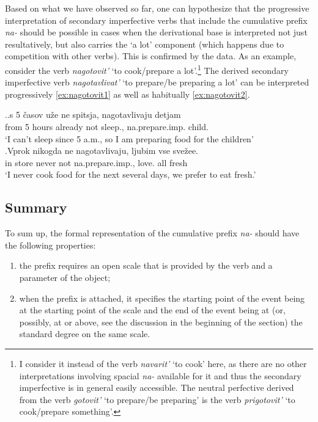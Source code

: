 Based on what we have observed so far, one can hypothesize that the progressive interpretation of secondary imperfective verbs that include the cumulative prefix \textit{na-} should be possible in cases when the derivational base is interpreted not just resultatively, but also carries the `a lot' component (which happens due to competition with other verbs). This is confirmed by the data. As an example, consider the verb \textit{nagotovit'} `to cook/prepare a lot'.\footnote{I consider it instead of the verb \textit{navarit'} `to cook' here, as there are no other interpretations involving spacial \textit{na-} available for it and thus the secondary imperfective is in general easily accessible. The neutral perfective derived from the verb \textit{gotovit'} `to prepare/be preparing' is the verb \textit{prigotovit'} `to cook/prepare something'.}  The derived secondary imperfective verb \textit{nagotavlivat'} `to prepare/be preparing a lot' can be interpreted progressively \ref{ex:nagotovit1} as well as habitually \ref{ex:nagotovit2}.

\ex.\label{ex:nagotovit}\ag.\label{ex:nagotovit1}s 5 \v{c}asov u\v{z}e ne spitsja, nagotavlivaju detjam\\
from 5 hours already not sleep., na.prepare.imp. child.\\
\trans `I can't sleep since 5 a.m., so I am preparing food for the children'\\
\bg.\label{ex:nagotovit2}Vprok nikogda ne nagotavlivaju, ljubim vse sve\v{z}ee.\\
{in store} never not na.prepare.imp., love. all fresh\\
\trans `I never cook food for the next several days, we prefer to eat fresh.'\\

\subsection{Summary} 
To sum up, the formal representation of the cumulative prefix \textit{na-} should have the following properties: 
\begin{enumerate}
\item the prefix requires an open scale that is provided by the verb and a parameter of the object;
\item when the prefix is attached, it specifies the starting point of the event being at the starting point of the scale and the end of the event being at (or, possibly, at or above, see the discussion in the beginning of the section) the standard degree on the same scale.
\end{enumerate}

